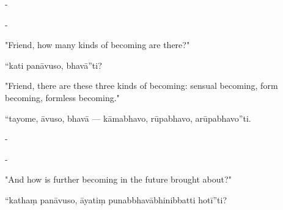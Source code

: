 \begin{samepage}
\begin{leftcolumn*}
-
\end{leftcolumn*}

\begin{rightcolumn}
-
\end{rightcolumn}
\end{samepage}

\begin{samepage}
\begin{leftcolumn*}
"Friend, how many kinds of becoming are there?"
\end{leftcolumn*}

\begin{rightcolumn}
“kati panāvuso, bhavā”ti?
\end{rightcolumn}
\end{samepage}

\begin{samepage}
\begin{leftcolumn*}
"Friend, there are these three kinds of becoming: sensual becoming, form becoming, formless becoming."
\end{leftcolumn*}

\begin{rightcolumn}
“tayome, āvuso, bhavā — kāmabhavo, rūpabhavo, arūpabhavo”ti.
\end{rightcolumn}
\end{samepage}

\begin{samepage}
\begin{leftcolumn*}
-
\end{leftcolumn*}

\begin{rightcolumn}
-
\end{rightcolumn}
\end{samepage}

\begin{samepage}
\begin{leftcolumn*}
"And how is further becoming in the future brought about?"
\end{leftcolumn*}

\begin{rightcolumn}
“kathaṃ panāvuso, āyatiṃ punabbhavābhinibbatti hotī”ti?
\end{rightcolumn}
\end{samepage}


